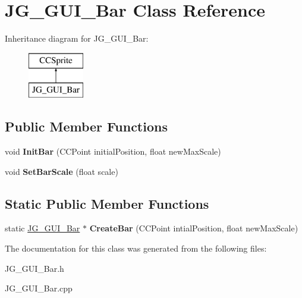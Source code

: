 \hypertarget{class_j_g___g_u_i___bar}{\section{J\-G\-\_\-\-G\-U\-I\-\_\-\-Bar Class Reference}
\label{class_j_g___g_u_i___bar}
}
Inheritance diagram for J\-G\-\_\-\-G\-U\-I\-\_\-\-Bar\-:\begin{figure}[H]
\begin{center}
\leavevmode
\includegraphics[height=2.000000cm]{class_j_g___g_u_i___bar}
\end{center}
\end{figure}
\subsection*{Public Member Functions}
\begin{DoxyCompactItemize}
\item 
\hypertarget{class_j_g___g_u_i___bar_a1e1defe038b261b82b4fc23b7236956f}{void {\bfseries Init\-Bar} (C\-C\-Point initial\-Position, float new\-Max\-Scale)}\label{class_j_g___g_u_i___bar_a1e1defe038b261b82b4fc23b7236956f}

\item 
\hypertarget{class_j_g___g_u_i___bar_a6e890de091921362483d2526a036a46c}{void {\bfseries Set\-Bar\-Scale} (float scale)}\label{class_j_g___g_u_i___bar_a6e890de091921362483d2526a036a46c}

\end{DoxyCompactItemize}
\subsection*{Static Public Member Functions}
\begin{DoxyCompactItemize}
\item 
\hypertarget{class_j_g___g_u_i___bar_aab9b7d52bf25a3299a8048960b7dd08c}{static \hyperlink{class_j_g___g_u_i___bar}{J\-G\-\_\-\-G\-U\-I\-\_\-\-Bar} $\ast$ {\bfseries Create\-Bar} (C\-C\-Point intial\-Position, float new\-Max\-Scale)}\label{class_j_g___g_u_i___bar_aab9b7d52bf25a3299a8048960b7dd08c}

\end{DoxyCompactItemize}


The documentation for this class was generated from the following files\-:\begin{DoxyCompactItemize}
\item 
J\-G\-\_\-\-G\-U\-I\-\_\-\-Bar.\-h\item 
J\-G\-\_\-\-G\-U\-I\-\_\-\-Bar.\-cpp\end{DoxyCompactItemize}
